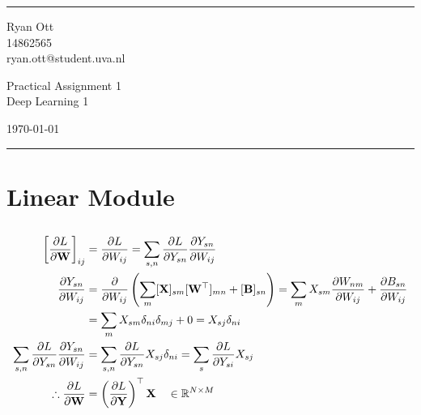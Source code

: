 \documentclass[a4paper]{article}
\begin{document}

\fancyhead[C]{}
\hrule \medskip %
\begin{minipage}{0.295\textwidth} 
\raggedright
\footnotesize
Ryan Ott \hfill\\   
14862565 \hfill\\
ryan.ott@student.uva.nl
\end{minipage}
\begin{minipage}{0.4\textwidth} 
\centering 
\large 
Practical Assignment 1\\ 
\normalsize 
Deep Learning 1\\ 
\end{minipage}
\begin{minipage}{0.295\textwidth} 
\raggedleft
\today\hfill\\
\end{minipage}
\medskip\hrule 
\bigskip

\section{Linear Module}
\subsection{} %
\begin{align}
   \left[ \frac{\partial L}{\partial \mathbf{W}} \right]_{ij} &= \frac{\partial L}{\partial W_{ij}} = \sum_{s,n} \frac{\partial L}{\partial Y_{sn}} \frac{\partial Y_{sn}}{\partial W_{ij}} \\
   \frac{\partial Y_{sn}}{\partial W_{ij}} &= \frac{\partial}{\partial W_{ij}} \left( \sum_{m} [\mathbf{X}]_{sm} [\mathbf{W}^\top]_{mn} + [\mathbf{B}]_{sn} \right) = \sum_m X_{sm} \frac{\partial W_{nm}}{\partial W_{ij}} + \frac{\partial B_{sn}}{\partial W_{ij}} \\
   &= \sum_m X_{sm} \delta_{ni} \delta_{mj} + 0 = X_{sj} \delta_{ni} \\
   \sum_{s,n} \frac{\partial L}{\partial Y_{sn}} \frac{\partial Y_{sn}}{\partial W_{ij}} &= \sum_{s,n} \frac{\partial L}{\partial Y_{sn}} X_{sj} \delta_{ni} = \sum_{s} \frac{\partial L}{\partial Y_{si}} X_{sj} \\
   \therefore \frac{\partial L}{\partial \mathbf{W}} &= \left( \frac{\partial L}{\partial \mathbf{Y}} \right)^\top \mathbf{X} \quad \in \mathbb{R}^{N \times M}
\end{align}
\end{document}
